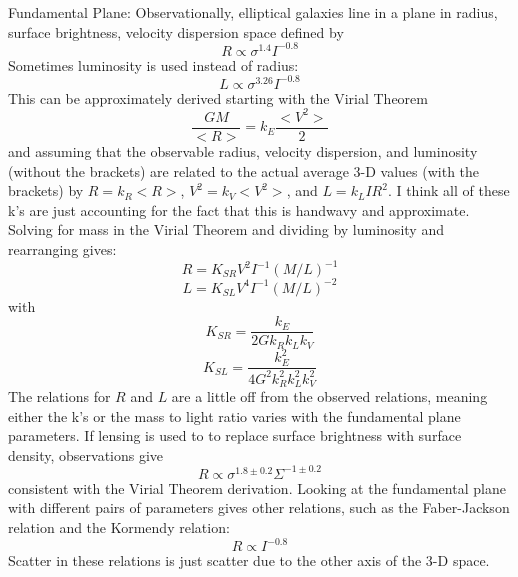 Fundamental Plane:\newline
Observationally, elliptical galaxies line in a plane in radius, surface 
brightness, velocity dispersion space defined by 
\begin{equation}
R\propto \sigma^{1.4}I^{-0.8}
\end{equation}
Sometimes luminosity is used instead of radius:
\begin{equation}
L\propto \sigma^{3.26}I^{-0.8}
\end{equation}
This can be approximately derived starting with the Virial Theorem
\begin{equation}
\frac{GM}{<R>}=k_E\frac{<V^2>}{2}
\end{equation}
and assuming that the observable radius, velocity dispersion, and luminosity 
(without the brackets) are related to the actual average $3$-D values (with 
the brackets) by $R=k_R<R>$, $V^2=k_V<V^2>$, and $L=k_LIR^2$.  I think all of 
these k's are just accounting for the fact that this is handwavy and 
approximate.  Solving for 
mass in the Virial Theorem and dividing by luminosity and rearranging gives:
\begin{equation}
R=K_{SR}V^2I^{-1}(M/L)^{-1}
\end{equation}
\begin{equation}
L=K_{SL}V^4I^{-1}(M/L)^{-2}
\end{equation}
with 
\begin{equation}
K_{SR}=\frac{k_E}{2Gk_Rk_Lk_V}
\end{equation}
\begin{equation}
K_{SL}=\frac{k_E^2}{4G^2k_R^2k_L^2k_V^2}
\end{equation}
The relations for $R$ and $L$ are a little off from the observed relations, 
meaning either the k's or the mass to light ratio varies with the fundamental 
plane parameters.  If lensing is used to to replace surface brightness with 
surface density, observations give 
\begin{equation}
R\propto \sigma^{1.8\pm0.2}\Sigma^{-1\pm0.2}
\end{equation}
consistent with the Virial Theorem derivation.  Looking at the fundamental 
plane with different pairs of parameters gives other relations, such as the 
Faber-Jackson relation and the Kormendy relation:
\begin{equation}
R\propto I^{-0.8}
\end{equation}
Scatter in these relations is just scatter due to the other axis of the $3$-D 
space.  

